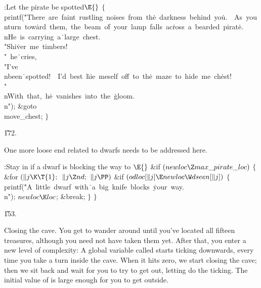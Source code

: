 \Y\B\4:Let the pirate be spotted\X${}\E{}$\6
${}\{{}$\1\6
\\{printf}(\.{"There\ are\ faint\ rus}\)\.{tling\ noises\ from\ th}\)\.{e\ darkness\ behind\ yo}\)\.{u.\ \ As\ you\\nturn\ tow}\)\.{ard\ them,\ the\ beam\ o}\)\.{f\ your\ lamp\ falls\ ac}\)\.{ross\ a\ bearded\ pirat}\)\.{e.\\nHe\ is\ carrying\ a}\)\.{\
large\ chest.\ \ \\"Shi}\)\.{ver\ me\ timbers!\\"\ he}\)\.{\ cries,\ \\"I've\\nbeen}\)\.{\ spotted!\ \ I'd\ best\ }\)\.{hie\ meself\ off\ to\ th}\)\.{e\ maze\ to\ hide\ me\ ch}\)\.{est!\\"\\nWith\ that,\ h}\)\.{e\ vanishes\ into\ the\ }\)\.{gloom.\\n"});%
\6
\&{goto} \\{move\_chest};\6
\4${}\}{}$\2\par
\U172.\fi

One more loose end related to dwarfs needs to be addressed here.

\Y\B\4:Stay in  if a dwarf is blocking the way to \X${}\E{}$\6
\&{if} ${}(\\{newloc}\Z\\{max\_pirate\_loc}){}$\5
${}\{{}$\1\6
\&{for} ${}(\|j\K\T{1};{}$ ${}\|j\Z\\{nd};{}$ ${}\|j\PP){}$\1\6
\&{if} ${}(\\{odloc}[\|j]\E\\{newloc}\W\\{dseen}[\|j]){}$\5
${}\{{}$\1\6
\\{printf}(\.{"A\ little\ dwarf\ with}\)\.{\ a\ big\ knife\ blocks\ }\)\.{your\ way.\\n"});\6
${}\\{newloc}\K\\{loc}{}$;\5
\&{break};\6
\4${}\}{}$\2\2\6
\4${}\}{}$\2\par
\U153.\fi

Closing the cave. You get to wander around until you've located all
fifteen treasures, although you need not have taken them yet. After that,
you enter a new level of complexity: A global variable called
 starts ticking downwards, every time you take a turn inside the cave.
When it hits zero, we start closing the cave; then we sit back and
wait for you to try to get out, letting \PB{\\{clock2}} do the ticking.
The initial value of \PB{\\{clock1}} is large enough for you to get outside.

